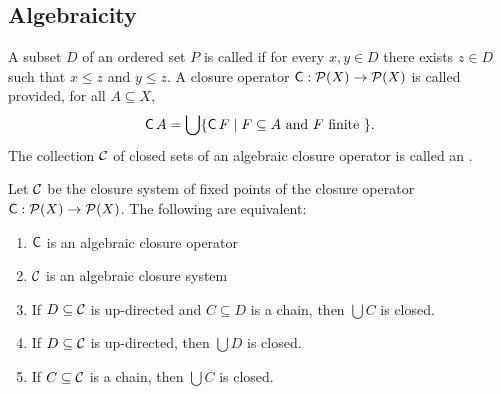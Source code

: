 \subsection{Algebraicity}
A subset $D$ of an ordered set $P$ is called 
if for every $x, y \in D$ there exists $z \in D$ such that
$x \leq z$ and $y \leq z$. 
A closure operator $\operatorname{\mathsf{C}}: \mathcal{P}(X) \to \mathcal{P}(X)$ is called  provided,
for all $A\subseteq X$, 
\[
\operatorname{\mathsf{C}} A = \bigcup \{\operatorname{\mathsf{C}} F \mid F \subseteq A \text{ and } F \text{ finite } \}.
\]
The collection $\mathcal{C}$ of closed sets of an algebraic closure operator is called an
.
\begin{theorem}
  Let $\mathcal{C}$ be the closure system of fixed points of the closure operator $\operatorname{\mathsf{C}}: \mathcal{P}(X) \to \mathcal{P}(X)$.
  The following are equivalent:
\begin{enumerate}
\item $\operatorname{\mathsf{C}}$ is an algebraic closure operator
\item $\mathcal{C}$ is an algebraic closure system
\item If $D\subseteq \mathcal{C}$ is up-directed and $C\subseteq D$ is a chain, then $\bigcup C$ is closed.
\item If $D\subseteq \mathcal{C}$ is up-directed, then $\bigcup D$ is closed.
\item If $C\subseteq \mathcal{C}$ is a chain, then $\bigcup C$ is closed.
\end{enumerate}
\end{theorem}




\printbibliography
























